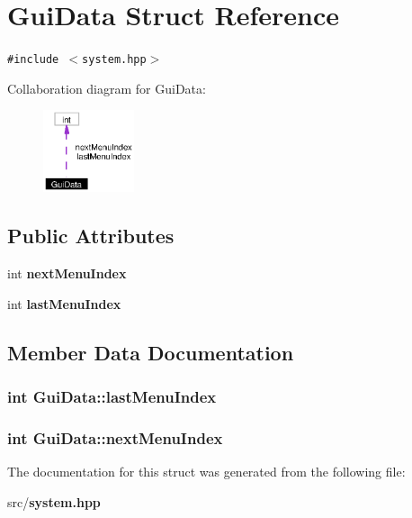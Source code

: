 \section{Gui\-Data Struct Reference}
\label{structGuiData}
{\tt \#include $<$system.hpp$>$}

Collaboration diagram for Gui\-Data:\begin{figure}[H]
\begin{center}
\leavevmode
\includegraphics[width=76pt]{structGuiData__coll__graph}
\end{center}
\end{figure}
\subsection*{Public Attributes}
\begin{CompactItemize}
\item 
int {\bf next\-Menu\-Index}
\item 
int {\bf last\-Menu\-Index}
\end{CompactItemize}


\subsection{Member Data Documentation}
\subsubsection{\setlength{\rightskip}{0pt plus 5cm}int {\bf Gui\-Data::last\-Menu\-Index}}\label{structGuiData_o1}


\subsubsection{\setlength{\rightskip}{0pt plus 5cm}int {\bf Gui\-Data::next\-Menu\-Index}}\label{structGuiData_o0}




The documentation for this struct was generated from the following file:\begin{CompactItemize}
\item 
src/{\bf system.hpp}\end{CompactItemize}
